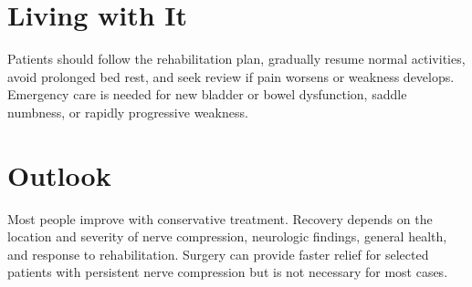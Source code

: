 \section{Living with It}
Patients should follow the rehabilitation plan, gradually resume normal activities, avoid prolonged bed rest, and seek review if pain worsens or weakness develops. Emergency care is needed for new bladder or bowel dysfunction, saddle numbness, or rapidly progressive weakness.
\section{Outlook}
Most people improve with conservative treatment. Recovery depends on the location and severity of nerve compression, neurologic findings, general health, and response to rehabilitation. Surgery can provide faster relief for selected patients with persistent nerve compression but is not necessary for most cases.
